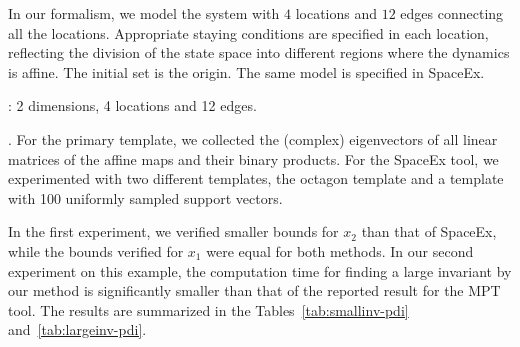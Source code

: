 In our formalism, we model the system with $4$ locations and $12$
edges connecting all the locations.  Appropriate staying conditions
are specified in each location, reflecting the division of the state
space into different regions where the dynamics is affine. The initial
set is the origin. The same model is specified in SpaceEx.

: 2 dimensions, 4 locations and 12 edges.

.  For the primary template, we collected the
(complex) eigenvectors of all linear matrices of the affine maps and
their binary products. For the SpaceEx tool, we experimented with two
different templates, the octagon template and a template with 100
uniformly sampled support vectors.

  In the first experiment, we verified smaller bounds
for $x_2$ than that of SpaceEx, while the bounds verified for $x_1$
were equal for both methods.  In our second experiment on this
example, the computation time for finding a large invariant by our
method is significantly smaller than that of the reported result for
the MPT tool.  The results are summarized in the
Tables~\ref{tab:smallinv-pdi} and~\ref{tab:largeinv-pdi}.

